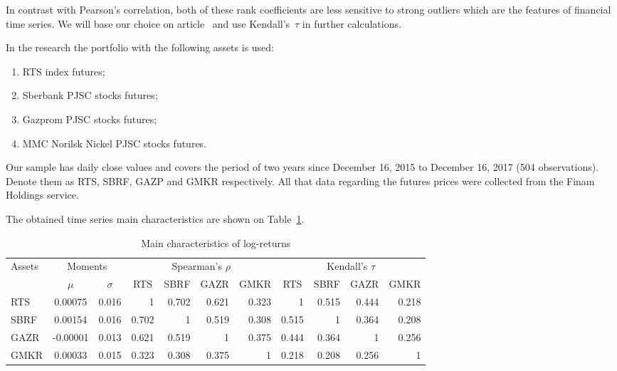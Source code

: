 In contrast with Pearson's correlation, both of these rank coefficients are less sensitive to strong outliers which are the features of financial time series.
We will base our choice on article~\cite{Dissmann2013} and use Kendall's~$\tau$ in further calculations.

In the research the portfolio with the following assets is used:
\begin{enumerate}[label=\arabic*)]
    \item RTS index futures;
    \item Sberbank PJSC stocks futures;
    \item Gazprom PJSC stocks futures;
    \item MMC Norilsk Nickel PJSC stocks futures.
\end{enumerate}

Our sample has daily close values and covers the period of two years since December 16, 2015 to December 16, 2017 (504 observations). 
Denote them as RTS, SBRF, GAZP and GMKR respectively.
All that data regarding the futures prices were collected from the Finam Holdings service.

The obtained time series main characteristics are shown on Table~\ref{eng:tab:eng:assets}.

\begin{table}[htb]
    \centering
    \caption{Main characteristics of log-returns}
    \label{eng:tab:eng:assets}
    \begin{adjustbox}{max width=\textwidth}
    \begin{tabular}{l|cc|rrrr|rrrr}
        \toprule
        \multirow{2}{*}{Assets} & \multicolumn{2}{c|}{Moments} & \multicolumn{4}{c|}{Spearman's $\rho$} & \multicolumn{4}{c}{Kendall's $\tau$} \\
        & $\mu$ & $\sigma$ & \multicolumn{1}{c}{RTS} & \multicolumn{1}{c}{SBRF} & \multicolumn{1}{c}{GAZR} & \multicolumn{1}{c|}{GMKR} & \multicolumn{1}{c}{RTS} & \multicolumn{1}{c}{SBRF} & \multicolumn{1}{c}{GAZR} & \multicolumn{1}{c}{GMKR} \\ 
        \midrule
RTS  &  0.00075 & 0.016 &     1 & 0.702 & 0.621 & 0.323 &     1 & 0.515 & 0.444 & 0.218 \\
SBRF &  0.00154 & 0.016 & 0.702 &     1 & 0.519 & 0.308 & 0.515 &     1 & 0.364 & 0.208 \\
GAZR & -0.00001 & 0.013 & 0.621 & 0.519 &     1 & 0.375 & 0.444 & 0.364 &     1 & 0.256 \\
GMKR &  0.00033 & 0.015 & 0.323 & 0.308 & 0.375 &     1 & 0.218 & 0.208 & 0.256 &     1 \\    
        \bottomrule
    \end{tabular}
    \end{adjustbox}
\end{table}


